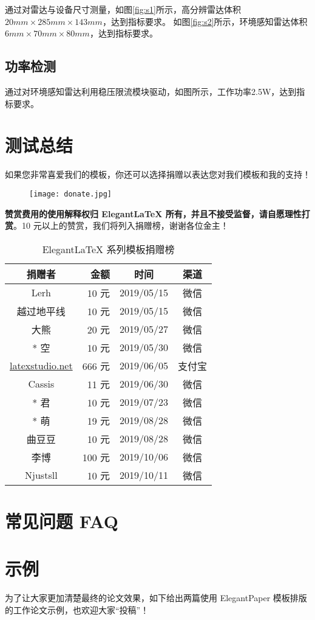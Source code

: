 \documentclass[lang=cn,11pt,a4paper]{elegantpaper}
\begin{document}
通过对雷达与设备尺寸测量，如图\ref{fig:s1}所示，高分辨雷达体积$20mm \times 285mm \times 143mm$，达到指标要求。
如图\ref{fig:s2}所示，环境感知雷达体积$6mm \times 70mm \times 80mm$，达到指标要求。
\subsection{功率检测}
通过对环境感知雷达利用稳压限流模块驱动，如图所示，工作功率2.5W，达到指标要求。


\section{测试总结}
如果您非常喜爱我们的模板，你还可以选择捐赠以表达您对我们模板和我的支持！

\begin{figure}[htbp]
  \centering
  \texttt{[image: donate.jpg]}
\end{figure}

\textbf{赞赏费用的使用解释权归 Elegant\LaTeX{} 所有，并且不接受监督，请自愿理性打赏}。10 元以上的赞赏，我们将列入捐赠榜，谢谢各位金主！

\begin{table}[!htbp]
  \centering
  \caption{Elegant\LaTeX{} 系列模板捐赠榜}
  \begin{tabular}{crcc}
    \toprule
    捐赠者   & 金额 & 时间 & 渠道 \\
    \midrule
    Lerh  & 10 元  & 2019/05/15 & 微信 \\
    越过地平线 & 10 元    & 2019/05/15 & 微信 \\
    大熊 &  20 元 & 2019/05/27 & 微信 \\
    * 空 & 10 元 & 2019/05/30 & 微信\\
    \href{http://www.latexstudio.net/}{latexstudio.net} & 666 元 & 2019/06/05 & 支付宝\\
    Cassis & 11 元 & 2019/06/30 & 微信\\
    * 君 & 10 元 & 2019/07/23 & 微信\\
    * 萌 & 19 元 & 2019/08/28 & 微信 \\
    曲豆豆 & 10 元 & 2019/08/28 & 微信 \\
    李博 & 100 元 & 2019/10/06 & 微信\\
    Njustsll & 10 元 & 2019/10/11 & 微信 \\
  \bottomrule
  \end{tabular}%
\end{table}%

\section{常见问题 FAQ}



\section{示例}

为了让大家更加清楚最终的论文效果，如下给出两篇使用 ElegantPaper 模板排版的工作论文示例，也欢迎大家“投稿”！


\end{document}
